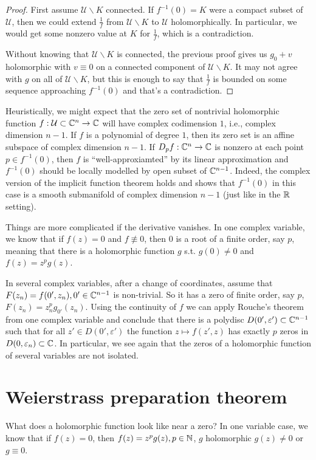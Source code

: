 \begin{proof}
  First assume $\mathcal{U}\backslash K$ connected. If $f^{-1}(0)=K$ were a compact subset of $\mathcal{U}$, then we could extend $\frac{1}{f}$ from $\mathcal{U} \backslash K$ to $\mathcal{U}$ holomorphically. In particular, we would get some nonzero value at  $K$ for $\frac{1}{f}$, which is a contradiction. 

  Without knowing that $\mathcal{U}\backslash K$ is connected, the previous proof gives us $g_0+v$ holomorphic with $v\equiv 0$ on a connected component of $\mathcal{U}\backslash K$. It may not agree with $g$ on all of $\mathcal{U}\backslash K$, but this is enough to say that $\frac{1}{f}$ is bounded on some sequence approaching $f^{-1}(0)$ and that's a contradiction.
\end{proof}

Heuristically, we might expect that the zero set of nontrivial holomorphic function  $f:\mathcal{U}\subset \mathbb{C}^{n}\to \mathbb{C}$ will have complex codimension $1$, i.e., complex dimension $n-1$. If $f$ is a polynomial of degree  $1$, then its zero set is an affine subspace of complex dimension $n-1$. If $D_p f:\mathbb{C}^{n}\to \mathbb{C}$ is nonzero at each point $p\in f^{-1}(0)$, then $f$ is ``well-approxiamted'' by its linear approximation and $f^{-1}(0)$ should be locally modelled by open subset of $\mathbb{C}^{n-1}$. Indeed, the complex version of the implicit function theorem holds and shows that $f^{-1}(0)$ in this case is a smooth submanifold of complex dimension $n-1$ (just like in the $\mathbb{R}$ setting).

Things are more complicated if the derivative vanishes. In one complex variable, we know that if  $f(z)=0$ and $f\not\equiv 0$, then $0$ is a root of a finite order, say $p$, meaning that there is a holomorphic function $g$ s.t. $g(0)\neq 0$ and $f(z)=z^{p}g(z)$.

In several complex variables, after a change of coordinates, assume that $F(z_n)=f(0',z_n),0' \in \mathbb{C}^{n-1}$ is non-trivial. So it has a zero of finite order, say $p$, $F(z_n)=z_n^{p}g_{0'}(z_n)$. Using the continuity of $f$ we can apply Rouche's theorem from one complex variable and conclude that there is a polydisc  $D(0',\varepsilon ') \subset \mathbb{C}^{n-1}$ such that for all $z' \in D(0',\varepsilon ')$ the function $z\mapsto f(z',z)$ has exactly $p$ zeros in $D(0,\varepsilon _n)\subset \mathbb{C}$. In particular, we see again that the zeros of a holomorphic function of several variables are not isolated.

\section{Weierstrass preparation theorem}
What does a holomorphic function look like near a zero? In one variable case, we know that if $f(z)=0$, then $f(z)=z^{p}g(z),p \in  \mathbb{N}$, $g$ holomorphic $g(z)\neq 0$ or $g\equiv 0$.

